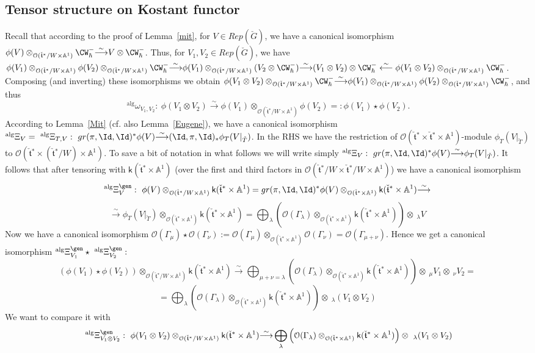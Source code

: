 \documentclass[11pt]{amsart}
\theoremstyle{definition}
\theoremstyle{remark}
\renewcommand{\O}{{\mathcal O}}
\theoremstyle{remark}
\newcommand{\cal}{\mathcal}
\newcommand{\iso}{{\stackrel{\sim}{\longrightarrow}}}
\newcommand{\<}{\langle}
\renewcommand{\>}{\rangle}
\newcommand{\Lt}{\check{\mathfrak t}{}}
\newcommand{\LG}{{\check{G}}}
\newcommand{\LT}{\check{T}{}}
\renewcommand{\O}{{\cal O}}
\newcommand{\Aone}{{\mathbb A}^1}
\newcommand{\kk}{\mathsf k}
\begin{document}
\subsection{Tensor structure on Kostant functor}
\label{tensphi}
Recall that according to the proof of Lemma~\ref{mit}, for $V\in Rep(\LG)$,
we have a canonical isomorphism $\phi(V)\otimes_{\O(\Lt^*/W\times\Aone)}
\CW^-_\hbar\iso V\otimes\CW^-_\hbar$. Thus, for $V_1,V_2\in Rep(\LG)$,
we have $\phi(V_1)\otimes_{\O(\Lt^*/W\times\Aone)}\phi(V_2)
\otimes_{\O(\Lt^*/W\times\Aone)}\CW^-_\hbar\iso
\phi(V_1)\otimes_{\O(\Lt^*/W\times\Aone)}(V_2\otimes\CW^-_\hbar)\iso
(V_1\otimes V_2)\otimes\CW^-_\hbar\stackrel{\sim}{\longleftarrow}
\phi(V_1\otimes V_2)\otimes_{\O(\Lt^*/W\times\Aone)}\CW^-_\hbar$.
Composing (and inverting) these isomorphisms we obtain
$\phi(V_1\otimes V_2)\otimes_{\O(\Lt^*/W\times\Aone)}\CW^-_\hbar\iso
\phi(V_1)\otimes_{\O(\Lt^*/W\times\Aone)}\phi(V_2)
\otimes_{\O(\Lt^*/W\times\Aone)}\CW^-_\hbar$, and thus
$$\ ^{\operatorname{alg}}\omega_{V_1,V_2}:\ \phi(V_1\otimes V_2)\iso
\phi(V_1)\otimes_{\O(\Lt^*/W\times\Aone)}\phi(V_2)=:\phi(V_1)\star\phi(V_2).$$
According to Lemma~\ref{Mit} (cf. also Lemma~\ref{Eugene}),
we have a canonical isomorphism 
$^{\operatorname{alg}}\Xi_V=\ 
^{\operatorname{alg}}\Xi_{T,V}:\ gr(\pi,\Id,\Id)^*\phi(V)\iso
(\Id,\pi,\Id)_*\phi_T(V|_{\LT})$. In the RHS we have the restriction of
$\O(\Lt^*\times\Lt^*\times\Aone)$-module $\phi_T(V|_{\LT})$ to
$\O(\Lt^*\times(\Lt^*/W)\times\Aone)$. To save a bit of notation in what
follows we will write simply 
$^{\operatorname{alg}}\Xi_V:\ gr(\pi,\Id,\Id)^*\phi(V)\iso
\phi_T(V|_{\LT})$. It follows that after tensoring with
$\kk(\Lt^*\times\Aone)$ (over the first and third factors in
$\O(\Lt^*/W\times\Lt^*/W\times\Aone)$) we have a canonical isomorphism
$$^{\operatorname{alg}}\Xi_V^\gen:\ 
\phi(V)\otimes_{\O(\Lt^*/W\times\Aone)}\kk(\Lt^*\times\Aone)=
gr(\pi,\Id,\Id)^*\phi(V)
\otimes_{\O(\Lt^*\times\Aone)}\kk(\Lt^*\times\Aone)\iso$$
$$\iso\phi_T(V|_{\LT})\otimes_{\O(\Lt^*\times\Aone)}\kk(\Lt^*\times\Aone)=
\bigoplus_\lambda\left(\O(\Gamma_\lambda)
\otimes_{\O(\Lt^*\times\Aone)}\kk(\Lt^*\times\Aone)\right)\otimes\ 
_\lambda V$$
Now we have a canonical isomorphism 
$\O(\Gamma_\mu)\star\O(\Gamma_\nu):=\O(\Gamma_\mu)
\otimes_{\O(\Lt^*\times\Aone)}\O(\Gamma_\nu)=\O(\Gamma_{\mu+\nu})$.
Hence we get a canonical isomorphism 
$^{\operatorname{alg}}\Xi_{V_1}^\gen\star\ 
^{\operatorname{alg}}\Xi_{V_2}^\gen:$ 
$$(\phi(V_1)\star\phi(V_2)) 
\otimes_{\O(\Lt^*/W\times\Aone)}\kk(\Lt^*\times\Aone)\iso
\bigoplus_{\mu+\nu=\lambda}\left(\O(\Gamma_\lambda)
\otimes_{\O(\Lt^*\times\Aone)}\kk(\Lt^*\times\Aone)\right)\otimes\
_\mu V_1\otimes\ _\nu V_2=$$
$$=\bigoplus_\lambda\left(\O(\Gamma_\lambda)
\otimes_{\O(\Lt^*\times\Aone)}\kk(\Lt^*\times\Aone)\right)\otimes\
_\lambda(V_1\otimes V_2)$$
We want to compare it with
$$\ ^{\operatorname{alg}}\Xi_{V_1\otimes V_2}^\gen:\
\phi(V_1\otimes V_2)\otimes_{\O(\Lt^*/W\times\Aone)}\kk(\Lt^*\times\Aone)
\iso\bigoplus_\lambda\left(\O(\Gamma_\lambda)
\otimes_{\O(\Lt^*\times\Aone)}\kk(\Lt^*\times\Aone)\right)\otimes\
_\lambda(V_1\otimes V_2)$$
\end{document}

